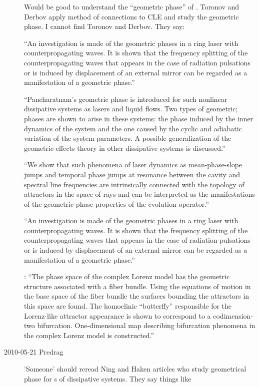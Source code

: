 \begin{description}
Would be good to understand the ``geometric phase'' of
. Toronov and Derbov apply
method of connections to CLE and study the geometric phase. I cannot find
Toronov and Derbov. They say:

``An investigation is made of the geometric phases in a ring laser with
   counterpropagating waves. It is shown that the frequency splitting of
   the counterpropagating waves that appears in the case of radiation
   pulsations or is induced by displacement of an external mirror can be
   regarded as a manifestation of a geometric phase.''

``Pancharatnam's geometric phase is introduced for such nonlinear
   dissipative systems as lasers and liquid flows. Two types of geometric;
   phases are shown to arise in these systems: the phase induced by the
   inner dynamics of the system and the one caused by the cyclic and
   adiabatic variation of the system parameters. A possible generalization
   of the geometric-effects theory in other dissipative systems is
   discussed.''

``We show that such phenomena of laser dynamics as
mean-phase-slope jumps and temporal phase jumps at resonance between the
cavity and spectral line frequencies are intrinsically connected with the
topology of attractors in the space of rays and can be interpreted as the
manifestations of the geometric-phase properties of the evolution
operator.''

``An investigation is made of the geometric phases in a ring laser with
   counterpropagating waves. It is shown that the frequency splitting of
   the counterpropagating waves that appears in the case of radiation
   pulsations or is induced by displacement of an external mirror can be
   regarded as a manifestation of a geometric phase.''

:
``The phase space of the complex Lorenz model has the
   geometric structure associated with a fiber bundle. Using the equations
   of motion in the base space of the fiber bundle the surfaces bounding
   the attractors in this space are found. The homoclinic ``butterffy''
   responsible for the Lorenz-like attractor appearance is shown to
   correspond to a codimension-two bifurcation. One-dimensional map
   describing bifurcation phenomena in the complex Lorenz model is
   constructed.''

\item[2010-05-21 Predrag] 'Someone' should reread
Ning and Haken articles who
study geometrical phase
for \rpo s of dissipative systems.
They say things like


\end{description}
